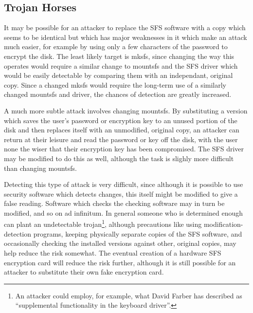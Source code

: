 \subsection{Trojan Horses}

It may be possible for an attacker to replace the SFS software with a copy
which seems to be identical but which has major weaknesses in it which make an
attack much easier, for example by using only a few characters of the password
to encrypt the disk.  The least likely target is mksfs, since changing the way
this operates would require a similar change to mountsfs and the SFS driver
which would be easily detectable by comparing them with an independant,
original copy.  Since a changed mksfs would require the long-term use of a
similarly changed mountsfs and driver, the chances of detection are greatly
increased.

A much more subtle attack involves changing mountsfs.  By substituting a
version which saves the user's password or encryption key to an unused portion
of the disk and then replaces itself with an unmodified, original copy, an
attacker can return at their leisure and read the password or key off the disk,
with the user none the wiser that their encryption key has been compromised.
The SFS driver may be modified to do this as well, although the task is slighly
more difficult than changing mountsfs.

Detecting this type of attack is very difficult, since although it is possible
to use security software which detects changes, this itself might be modified
to give a false reading.  Software which checks the checking software may in
turn be modified, and so on ad infinitum.  In general someone who is determined
enough can plant an undetectable trojan\footnote{
              An attacker could employ, for example, what David Farber has
              described as ``supplemental functionality in the keyboard driver''.
}, although precautions like using
modification-detection programs, keeping physically separate copies of the SFS
software, and occasionally checking the installed versions against other,
original copies, may help reduce the risk somewhat.  The eventual creation of a
hardware SFS encryption card will reduce the risk further, although it is still
possible for an attacker to substitute their own fake encryption card.

